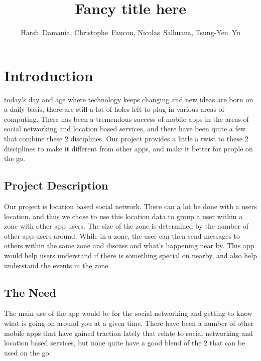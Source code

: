 \documentclass[11pt, journal]{IEEEtran}
\begin{document}
\title{Fancy title here}

\author{Harsh~Damania, Christophe~Faucon, Nicolas~Salhuana, Tsung-Yen~Yu}


\maketitle
\IEEEdisplaynotcompsoctitleabstractindextext

\section{Introduction}
	 today's day and age where technology keeps changing and new ideas are born on a daily basis, there are still a lot of holes left to plug in various areas of computing. There has been a tremendous success of mobile apps in the areas of social networking and location based services, and there have been quite a few that combine these 2 disciplines. Our project provides a little a twist to these 2 disciplines to make it different from other apps, and make it better for people on the go.

	\subsection{Project Description}
		Our project is location based social network. There can a lot be done with a users location, and thus we chose to use this location data to group a user within a zone with other app users. The size of the zone is determined by the number of other app users around. While in a zone, the user can then send messages to others within the same zone and discuss and what's happening near by. This app would help users understand if there is something special on nearby, and also help understand the events in the zone.
	
	\subsection{The Need}

		The main use of the app would be for the social networking and getting to know what is going on around you at a given time. There have been a number of other mobile apps that have gained traction lately that relate to social networking and location based services, but none quite have a good blend of the 2 that can be used on the go.
\end{document}
